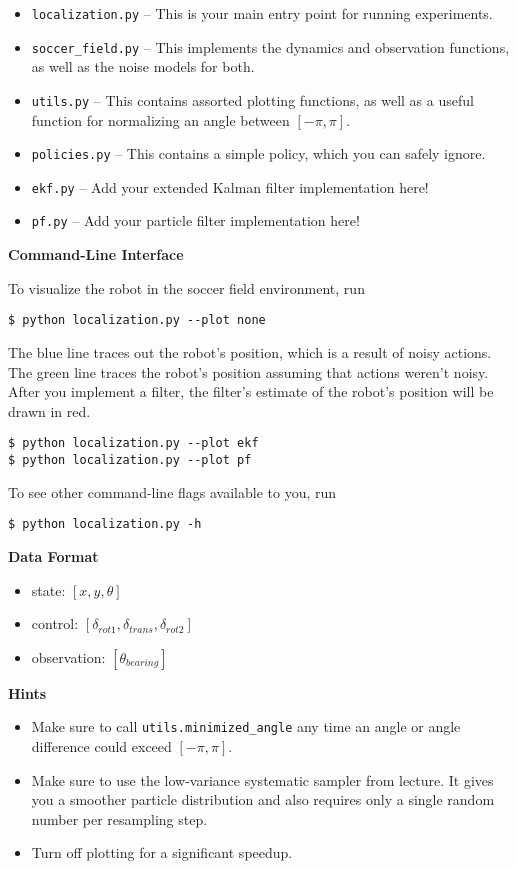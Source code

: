 \documentclass{article}
\newcommand{\?}{\stackrel{?}{=}}
\begin{document}
\begin{itemize}
\item \verb|localization.py| -- This is your main entry point for running experiments.
\item \verb|soccer_field.py| -- This implements the dynamics and observation functions, as well as the noise models for both.
\item \verb|utils.py| -- This contains assorted plotting functions, as well as a useful function for normalizing an angle between $[-\pi, \pi]$.
\item \verb|policies.py| -- This contains a simple policy, which you can safely ignore.
\item \verb|ekf.py| -- Add your extended Kalman filter implementation here!
\item \verb|pf.py| -- Add your particle filter implementation here!
\end{itemize}

\textbf{Command-Line Interface}

To visualize the robot in the soccer field environment, run
\begin{verbatim}
$ python localization.py --plot none
\end{verbatim}
The blue line traces out the robot's position, which is a result of noisy actions.
The green line traces the robot's position assuming that actions weren't noisy.
After you implement a filter, the filter's estimate of the robot's position will be drawn in red.
\begin{verbatim}
$ python localization.py --plot ekf
$ python localization.py --plot pf
\end{verbatim}
To see other command-line flags available to you, run
\begin{verbatim}
$ python localization.py -h
\end{verbatim}

\textbf{Data Format}

\begin{itemize}
\item state: $[x, y, \theta]$
\item control: $[\delta_{rot1}, \delta_{trans}, \delta_{rot2}]$
\item observation: $[\theta_{bearing}]$
\end{itemize}

\textbf{Hints}

\begin{itemize}
\item
Make sure to call \verb|utils.minimized_angle| any time an angle or angle difference could exceed $[-\pi, \pi]$.
\item
Make sure to use the low-variance systematic sampler from lecture.
It gives you a smoother particle distribution and also requires only a single random number per resampling step.
\item
Turn off plotting for a significant speedup.
\end{itemize}
\end{document}
